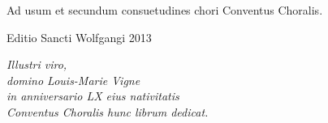 \documentclass[a4paper, twoside, 12pt]{article}
\newcommand{\annusEditionis}{2013}
\begin{document}
\newcommand{\setgrefactorNormal}{%
  }

\setgrefactorNormal

\newcommand{\spacearoundinitialNormal}{
}

\spacearoundinitialNormal

\def\greinitialformat#1{%
{\fontsize{38}{38}\selectfont #1}%
}

\pagestyle{empty}

\setlength{\columnseprule}{1pt} %
\setlength{\columnsep}{20pt} %

\begin{titulusOfficii}
\end{titulusOfficii}

\vfill

\begin{center}
Ad usum et secundum consuetudines chori \guillemotright Conventus Choralis\guillemotleft.

Editio Sancti Wolfgangi \annusEditionis
\end{center}

\pagebreak

\mbox{}\hfill

\begin{center}
\it
Illustri viro,\\
domino 
Louis-Marie Vigne\\
in anniversario LX
eius nativitatis\\
Conventus Choralis 
hunc librum dedicat.
\end{center}

\hfill\mbox{}

\pagebreak



\vfill

\pagebreak




\anteOfficiumOratio


\postOfficiumOratio

\pagebreak
\end{document}
